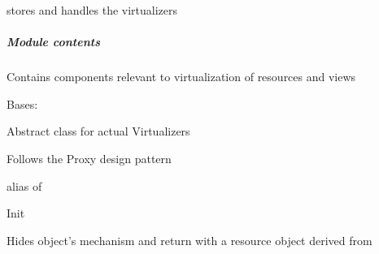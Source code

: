 \documentclass[letterpaper,10pt,english]{sphinxmanual}
\begin{document}
{\hyperref[orchest/virtualization_mgmt:escape.orchest.virtualization_mgmt.VirtualizerManager]{\emph{}}} stores and handles the virtualizers


\subparagraph{Module contents}
\label{orchest/virtualization_mgmt:module-contents}\label{orchest/virtualization_mgmt:module-escape.orchest.virtualization_mgmt}
Contains components relevant to virtualization of resources and views

\begin{fulllineitems}
\label{orchest/virtualization_mgmt:escape.orchest.virtualization_mgmt.AbstractVirtualizer}
Bases: \href{https://docs.python.org/2.7/library/functions.html\#object}{}

Abstract class for actual Virtualizers

Follows the Proxy design pattern

\begin{fulllineitems}
\label{orchest/virtualization_mgmt:escape.orchest.virtualization_mgmt.AbstractVirtualizer.__metaclass__}
alias of 

\end{fulllineitems}


\begin{fulllineitems}
\label{orchest/virtualization_mgmt:escape.orchest.virtualization_mgmt.AbstractVirtualizer.__init__}
Init

\end{fulllineitems}


\begin{fulllineitems}
\label{orchest/virtualization_mgmt:escape.orchest.virtualization_mgmt.AbstractVirtualizer.get_resource_info}
Hides object's mechanism and return with a resource object derived from
{\hyperref[util/nffg:escape.util.nffg.NFFG]{\emph{}}}


\end{fulllineitems}
\end{fulllineitems}
\end{document}

